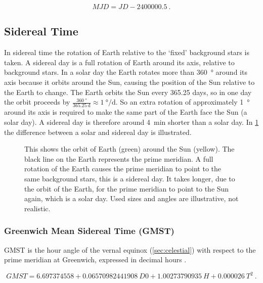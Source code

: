 \begin{equation}
    \mathit{MJD} = \mathit{JD} - 2400000.5 \ .
\end{equation}


\subsection{Sidereal Time}

In sidereal time the rotation of Earth relative to the `fixed'
background stars is taken. A sidereal day is a full rotation of Earth
around its axis, relative to background stars. In a solar day the Earth
rotates more than \SI{360}{\degree} around its axis because it orbits
around the Sun, causing the position of the Sun relative to the Earth to
change. The Earth orbits the Sun every 365.25 days, so in one day the
orbit proceeds by $\frac{\SI{360}{\degree}}{\SI{365.25}{\day}} \approx
\SI{1}{\degree\per\day}$. So an extra rotation of approximately
\SI{1}{\degree} around its axis is required to make the same part of the
Earth face the Sun (a solar day). A sidereal day is therefore around
\SI{4}{\minute} shorter than a solar day. In \cref{fig:sidereal_time}
the difference between a solar and sidereal day is illustrated.

\begin{figure}
    \centering
    
    \caption{This shows the orbit of Earth (green) around the Sun
             (yellow). The black line on the Earth represents the prime
             meridian. A full rotation of the Earth causes the prime
             meridian to point to the same background stars, this is a
             sidereal day. It takes longer, due to the orbit of the
             Earth, for the prime meridian to point to the Sun again,
             which is a solar day. Used sizes and angles are
             illustrative, not realistic.}
    \label{fig:sidereal_time}
\end{figure}


\subsubsection{Greenwich Mean Sidereal Time (GMST)}

GMST is the hour angle of the vernal equinox (\cref{sec:celestial})
with respect to the prime meridian at Greenwich, expressed in decimal
hours \cite{kaplan:2011aa}.

\begin{equation}
    \mathit{GMST} = 6.697374558 + 0.06570982441908\ \mathit{D0} +
                    1.00273790935\ H + 0.000026\ T^2 \ .
\end{equation}

